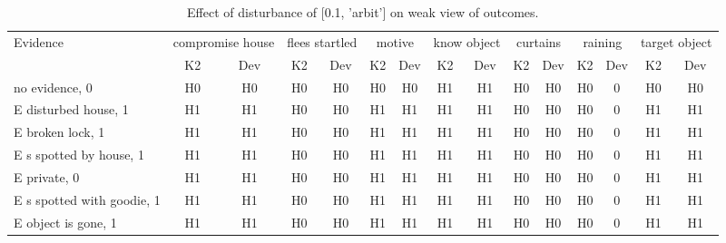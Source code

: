 \begin{table}\begin{tabular}{l|cc|cc|cc|cc|cc|cc|cc}\toprule\multirow{2}{*}{Evidence} & \multicolumn{2}{c}{compromise house}& \multicolumn{2}{c}{flees startled}& \multicolumn{2}{c}{motive}& \multicolumn{2}{c}{know object}& \multicolumn{2}{c}{curtains}& \multicolumn{2}{c}{raining}& \multicolumn{2}{c}{target object}\\& {K2} & {Dev}& {K2} & {Dev}& {K2} & {Dev}& {K2} & {Dev}& {K2} & {Dev}& {K2} & {Dev}& {K2} & {Dev}\\\midrule
no evidence, 0 & H0&H0&H0&H0&H0&H0&H1&H1&H0&H0&\cellcolor{Bittersweet}H0&\cellcolor{Bittersweet}0&H0&H0\\E disturbed house, 1 & H1&H1&H0&H0&H1&H1&H1&H1&H0&H0&\cellcolor{Bittersweet}H0&\cellcolor{Bittersweet}0&H1&H1\\E broken lock, 1 & H1&H1&H0&H0&H1&H1&H1&H1&H0&H0&\cellcolor{Bittersweet}H0&\cellcolor{Bittersweet}0&H1&H1\\E s spotted by house, 1 & H1&H1&H0&H0&H1&H1&H1&H1&H0&H0&\cellcolor{Bittersweet}H0&\cellcolor{Bittersweet}0&H1&H1\\E private, 0 & H1&H1&H0&H0&H1&H1&H1&H1&H0&H0&\cellcolor{Bittersweet}H0&\cellcolor{Bittersweet}0&H1&H1\\E s spotted with goodie, 1 & H1&H1&H0&H0&H1&H1&H1&H1&H0&H0&\cellcolor{Bittersweet}H0&\cellcolor{Bittersweet}0&H1&H1\\E object is gone, 1 & H1&H1&H0&H0&H1&H1&H1&H1&H0&H0&\cellcolor{Bittersweet}H0&\cellcolor{Bittersweet}0&H1&H1\\\bottomrule\end{tabular}\caption{Effect of disturbance of [0.1, 'arbit'] on weak view of outcomes.}\end{table}